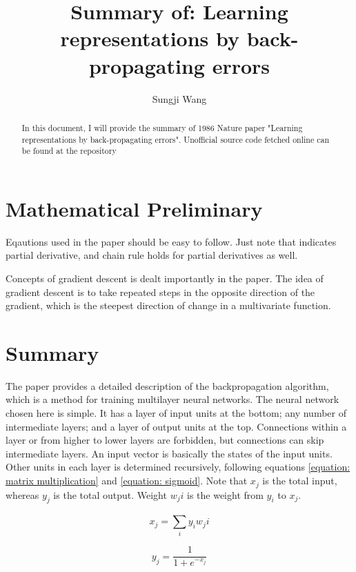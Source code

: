 \documentclass{article}
\begin{document}
\title{Summary of: Learning representations by back-propagating errors }
\author[1]{Sungji Wang}
\maketitle
\begin{abstract}
    In this document, I will provide the summary of 1986 Nature paper "Learning representations by back-propagating errors".
    Unofficial source code fetched online can be found at the repository
\end{abstract}

\section{Mathematical Preliminary}
Eqautions used in the paper should be easy to follow. Just note that {\partial} indicates partial derivative, and chain rule holds for partial derivatives as well.

Concepts of gradient descent is dealt importantly in the paper.
The idea of gradient descent is to take repeated steps in the opposite direction of the gradient, which is the steepest direction of change in a multivariate function.

\section{Summary}
The paper provides a detailed description of the backpropagation algorithm, which is a method for training multilayer neural networks.
The neural network chosen here is simple. It has a layer of input units at the bottom; any number of intermediate layers; and a layer of output units at the top.
Connections within a layer or from higher to lower layers are forbidden, but connections can skip intermediate layers.
An input vector is basically the states of the input units.
Other units in each layer is determined recursively, following equations \ref{equation: matrix multiplication} and \ref{equation: sigmoid}.
Note that $x_j$ is the total input, whereas $y_j$ is the total output.
Weight $w_ji$ is the weight from $y_i$ to $x_j$.

\begin{equation}
    x_j = \sum_{i}^{} {y_i w_ji} 
    \label{equation: matrix multiplication}
\end{equation}

\begin{equation}
    y_j = \frac{1}{1+e^{-x_j}} 
    \label{equation: sigmoid}
\end{equation}
\end{document}
